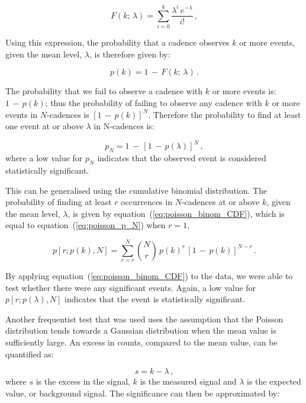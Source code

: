 \begin{equation}
F(k; \, \lambda) = \sum_{i=0}^{k}  \frac{\lambda^i \, e^{-\lambda}}{i!} \, ,
\label{eq:poisson_CDF}
\end{equation}


Using this expression, the probability that a cadence observes $k$ or more events, given the mean level, $\lambda$, is therefore given by: 

\begin{equation}
p(k) = 1 \, - \, F(k; \, \lambda) \, .
\label{eq:poisson_SF}
\end{equation}

The probability that we fail to observe a cadence with $k$ or more events is: $1 \, - \, p(k)$; thus the probability of failing to observe any cadence with $k$ or more events in $N$-cadences is $[1 \, - \, p(k)]^N$. Therefore the probability to find at least one event at or above $\lambda$ in N-cadences is:

\begin{equation}
p_N = 1\, - \, [1 \, - \, p(\lambda)]^N \, ,
\label{eq:poisson_p_N}
\end{equation}
%
where a low value for $p_N$ indicates that the observed event is considered statistically significant.

This can be generalised using the cumulative binomial distribution. The probability of finding at least $r$ occurrences in $N$-cadences at or above $k$, given the mean level, $\lambda$, is given by equation~(\ref{eq:poisson_binom_CDF}), which is equal to equation~(\ref{eq:poisson_p_N}) when $r=1$,

\begin{equation}
p[r; p(k), N] = \sum_{r=r}^{N} \binom{N}{r} \, p(k)^r \, [1 \, - \, p(k)]^{N-r} \, .
\label{eq:poisson_binom_CDF}
\end{equation}

By applying equation~(\ref{eq:poisson_binom_CDF}) to the data, we were able to test whether there were any significant events. Again, a low value for $p[r; p(\lambda), N]$ indicates that the event is statistically significant.


Another frequentist test that was used uses the assumption that the Poisson distribution tends towards a Gaussian distribution when the mean value is sufficiently large. An excess in counts, compared to the mean value, can be quantified as:

\begin{equation}
s = k - \lambda \, ,
\label{eq:poisson_excess}
\end{equation}
%
where $s$ is the excess in the signal, $k$ is the measured signal and $\lambda$ is the expected value, or background signal. The significance can then be approximated by:

